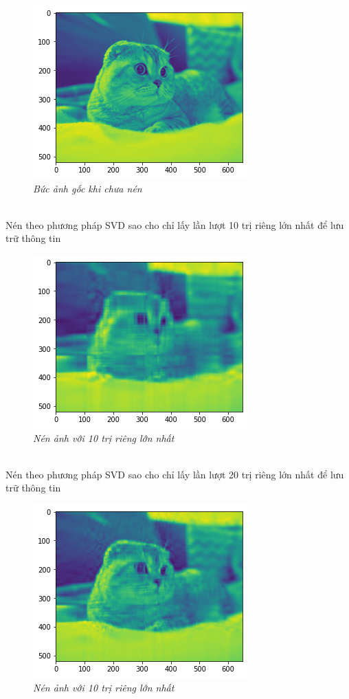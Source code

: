 \begin{figure}[!ht]
	\centering
	\includegraphics[scale=0.6]{goc}
	\caption{\textit{Bức ảnh gốc khi chưa nén}}\label{fig:Picture}
\end{figure}\\
Nén theo phương pháp SVD sao cho chỉ lấy lần lượt 10 trị riêng lớn nhất để lưu trữ thông tin \\
\begin{figure}[!ht]
	\centering
	\includegraphics[scale=0.6]{10_}
	\caption{\textit{Nén ảnh với 10 trị riêng lớn nhất}}\label{fig:Picture}
\end{figure}\\

Nén theo phương pháp SVD sao cho chỉ lấy lần lượt 20 trị riêng lớn nhất để lưu trữ thông tin \\
\begin{figure}[!ht]
	\centering
	\includegraphics[scale=0.6]{20_}
	\caption{\textit{Nén ảnh với 10 trị riêng lớn nhất}}\label{fig:Picture}
\end{figure}\\

